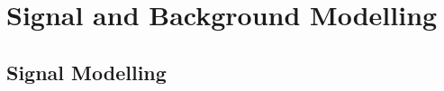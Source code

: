 \documentclass[NOTE, atlasdraft=true, texlive=2017, UKenglish]{\ATLASLATEXPATH atlasdoc}
\begin{document}
\clearpage
\section{Signal and Background Modelling}
\label{sec:modelling}




\subsection{Signal Modelling}
\label{sec:sigmodelling}
\end{document}
